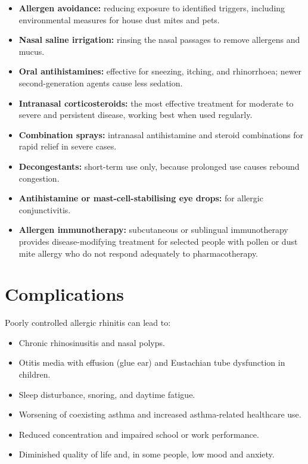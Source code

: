\begin{itemize}
    \item \textbf{Allergen avoidance:} reducing exposure to identified triggers, including environmental measures for house dust mites and pets.
    \item \textbf{Nasal saline irrigation:} rinsing the nasal passages to remove allergens and mucus.
    \item \textbf{Oral antihistamines:} effective for sneezing, itching, and rhinorrhoea; newer second-generation agents cause less sedation.
    \item \textbf{Intranasal corticosteroids:} the most effective treatment for moderate to severe and persistent disease, working best when used regularly.
    \item \textbf{Combination sprays:} intranasal antihistamine and steroid combinations for rapid relief in severe cases.
    \item \textbf{Decongestants:} short-term use only, because prolonged use causes rebound congestion.
    \item \textbf{Antihistamine or mast-cell-stabilising eye drops:} for allergic conjunctivitis.
    \item \textbf{Allergen immunotherapy:} subcutaneous or sublingual immunotherapy provides disease-modifying treatment for selected people with pollen or dust mite allergy who do not respond adequately to pharmacotherapy.
\end{itemize}

\section*{Complications}
Poorly controlled allergic rhinitis can lead to:

\begin{itemize}
    \item Chronic rhinosinusitis and nasal polyps.
    \item Otitis media with effusion (glue ear) and Eustachian tube dysfunction in children.
    \item Sleep disturbance, snoring, and daytime fatigue.
    \item Worsening of coexisting asthma and increased asthma-related healthcare use.
    \item Reduced concentration and impaired school or work performance.
    \item Diminished quality of life and, in some people, low mood and anxiety.
\end{itemize}

